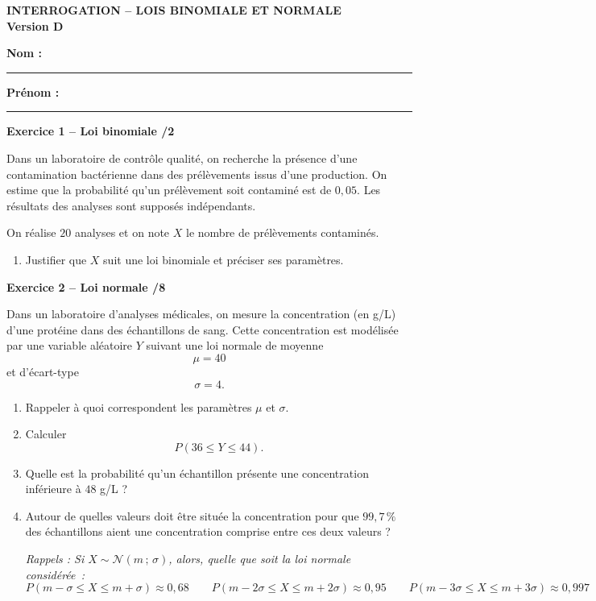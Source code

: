 \documentclass[10pt,a4paper]{article}
\newcommand{\version}[1]{
    \begin{center}
        \textbf{\large INTERROGATION -- LOIS BINOMIALE ET NORMALE}\\
        \textbf{Version #1}
    \end{center}

    \vspace{-0.1cm}

    \textbf{Nom :} \rule{5cm}{0.4pt}
    \hfill
    \textbf{Prénom :} \rule{4cm}{0.4pt}

    \vspace{0.2cm}
}
\begin{document}
\vfill


\version{D}

\textbf{Exercice 1 -- Loi binomiale \hfill /2}

Dans un laboratoire de contrôle qualité, on recherche la présence
d'une contamination bactérienne dans des prélèvements issus d'une
production. On estime que la probabilité qu'un prélèvement soit
contaminé est de $0,05$. Les résultats des analyses sont supposés
indépendants.

On réalise $20$ analyses et on note $X$ le nombre de prélèvements
contaminés.

\begin{enumerate}[label=\arabic*.]
    \item Justifier que $X$ suit une loi binomiale et préciser ses paramètres.
\end{enumerate}

\vfill

\textbf{Exercice 2 -- Loi normale \hfill /8}

Dans un laboratoire d'analyses médicales, on mesure la concentration
(en g/L) d'une protéine dans des échantillons de sang. Cette
concentration est modélisée par une variable aléatoire $Y$ suivant
une loi normale de moyenne
\[
\mu=40
\]
et d'écart-type
\[
\sigma=4.
\]

\begin{enumerate}[label=\arabic*.]
    \item Rappeler à quoi correspondent les paramètres $\mu$ et $\sigma$.

    \item Calculer
    \[
    P(36\leq Y\leq44).
    \]

    \item Quelle est la probabilité qu'un échantillon présente une
    concentration inférieure à $48$ g/L ?

    \item Autour de quelles valeurs doit être située la concentration
    pour que $99,7\,\%$ des échantillons aient une concentration comprise
    entre ces deux valeurs ?

    \textit{Rappels : Si $X \sim \mathcal{N}(m\,;\,\sigma)$, alors, quelle que soit la loi normale considérée~:
$$P(m-\sigma \leqslant X \leqslant m+\sigma) \approx 0{,}68 \qquad P(m-2\sigma \leqslant X \leqslant m+2\sigma) \approx 0{,}95 \qquad P(m-3\sigma \leqslant X \leqslant m+3\sigma) \approx 0{,}997$$} 
\end{enumerate}
\end{document}
